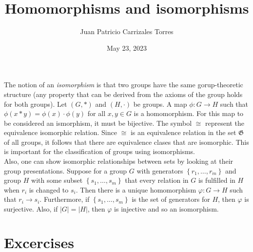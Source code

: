 \documentclass[12pt]{article}
\begin{document}
  
 \title{Homomorphisms and isomorphisms}
   \author{Juan Patricio Carrizales Torres}
     \date{May 23, 2023}
       \maketitle

       The notion of an \textit{isomorphism} is that two groups have the same gorup-theoretic structure (any property that can be derived from the axioms of the group holds for both groups). Let $(G,*)$ and $(H,\cdot)$ be groups. A map $\phi: G\to H$ such that $\phi(x*y)=\phi(x)\cdot\phi(y)$ for all $x,y\in G$ is a homomorphism. For this map to be considered an ismorphism, it must be bijective. The symbol $\cong$ represent the equivalence isomorphic relation. Since $\cong$ is an equivalence relation in the set $\mathfrak{G}$ of all groups, it follows that there are equivalence clases that are isomorphic. This is important for the classification of groups using isomorphisms.\\

       Also, one can show isomorphic relationships between sets by looking at their group presentations. Suppose for a group $G$ with generators $\left\{r_{1},\dots,r_{m} \right\}$ and group $H$ with some subset $\left\{s_{1},\dots,s_{m}  \right\}$ that every relation in $G$ is fulfilled in $H$ when $r_{i}$ is changed to $s_{i}$. Then there is a unique homomorphism $\varphi:G\to H$ such that $r_{i}\to s_{i}$. Furthermore, if $\left\{ s_{1},\dots,s_{m} \right\}$ is the set of generators for $H$, then $\varphi$ is surjective. Also, if $|G|=|H|$, then $\varphi$ is injective and so an isomorphism.
\section{Excercises}
\end{document}
